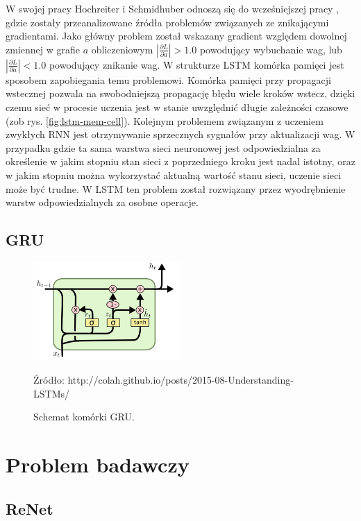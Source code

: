 \documentclass[oneside, mag]{mgr}
\begin{document}
W swojej pracy \cite{LSTM} Hochreiter i Schmidhuber odnoszą się do wcześniejszej pracy \cite{vanishing_gradient_RNN}, gdzie zostały przeanalizowane źródła problemów związanych ze znikającymi gradientami. Jako główny problem został wskazany gradient względem dowolnej zmiennej w grafie $a$ obliczeniowym $|\frac{\partial L}{\partial a}| > 1.0$ powodujący wybuchanie wag, lub $|\frac{\partial L}{\partial a}| < 1.0$ powodujący znikanie wag. W strukturze LSTM komórka pamięci jest sposobem zapobiegania temu problemowi. Komórka pamięci przy propagacji wstecznej pozwala na swobodniejszą propagację błędu wiele kroków wstecz, dzięki czemu sieć w procesie uczenia jest w stanie uwzględnić długie zależności czasowe (zob rys. \ref{fig:lstm-mem-cell}). Kolejnym problemem związanym z uczeniem zwykłych RNN jest otrzymywanie sprzecznych sygnałów przy aktualizacji wag. W przypadku gdzie ta sama warstwa sieci neuronowej jest odpowiedzialna za określenie w jakim stopniu stan sieci z poprzedniego kroku jest nadal istotny, oraz w jakim stopniu można wykorzystać aktualną wartość stanu sieci, uczenie sieci może być trudne. W LSTM ten problem został rozwiązany przez wyodrębnienie warstw odpowiedzialnych za osobne operacje.  

\section{GRU}

\begin{figure}
\centering
	\includegraphics[width=0.5\textwidth]{img/LSTM3-var-GRU.png}
	\caption{Schemat komórki GRU.} Źródło: http://colah.github.io/posts/2015-08-Understanding-LSTMs/
	\label{fig:gru}
\end{figure}

\chapter{Problem badawczy}

\section{ReNet}
\end{document}
